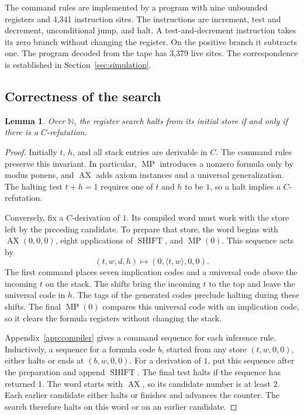 \documentclass[11pt,letterpaper]{article}
\newtheorem{lemma}{Lemma}
\newcommand{\N}{\mathbb{N}}
\newcommand{\pair}[2]{\langle #1,#2\rangle}
\DeclareMathOperator{\AX}{AX}
\DeclareMathOperator{\MP}{MP}
\DeclareMathOperator{\SHIFT}{SHIFT}
\begin{document}
The command rules are implemented by a program with nine unbounded
registers and 4,341 instruction sites. The instructions are increment,
test and decrement, unconditional jump, and halt. A test-and-decrement
instruction takes its zero branch without changing the register. On
the positive branch it subtracts one. The program decoded from the
tape has 3,379 live sites. The correspondence is established in
Section~\ref{sec:simulation}.

\subsection{Correctness of the search}

\begin{lemma}\label{lem:search}
Over $\N$, the register search halts from its initial store if and
only if there is a $C$-refutation.
\end{lemma}

\begin{proof}
Initially $t$, $h$, and all stack entries are derivable in $C$.
The command rules preserve this invariant. In particular, $\MP$
introduces a nonzero formula only by modus ponens, and $\AX$
adds axiom instances and a universal generalization. The halting
test $t+h=1$ requires one of $t$ and $h$ to be $1$, so a halt
implies a $C$-refutation.

Conversely, fix a $C$-derivation of $1$. Its compiled word must
work with the store left by the preceding candidate. To prepare
that store, the word begins with $\AX(0,0,0)$, eight applications
of $\SHIFT$, and $\MP(0)$. This sequence acts by
\[
  (t,w,d,h)\longmapsto (0,\pair{t}{w},0,0).
\]
The first command places seven implication codes and a universal
code above the incoming $t$ on the stack. The shifts bring the
incoming $t$ to the top and leave the universal code in $h$.
The tags of the generated codes preclude halting during these
shifts. The final $\MP(0)$ compares this universal code with an
implication code, so it clears the formula registers without
changing the stack.

Appendix~\ref{app:compiler} gives a command sequence for each
inference rule. Inductively, a sequence for a formula code $b$,
started from any store $(t,w,0,0)$, either halts or ends at
$(b,w,0,0)$. For a derivation of $1$, put this sequence after
the preparation and append $\SHIFT$. The final test halts
if the sequence has returned $1$. The word starts with $\AX$,
so its candidate number is at least $2$. Each earlier candidate
either halts or finishes and advances the counter. The search
therefore halts on this word or on an earlier candidate.
\end{proof}
\end{document}
